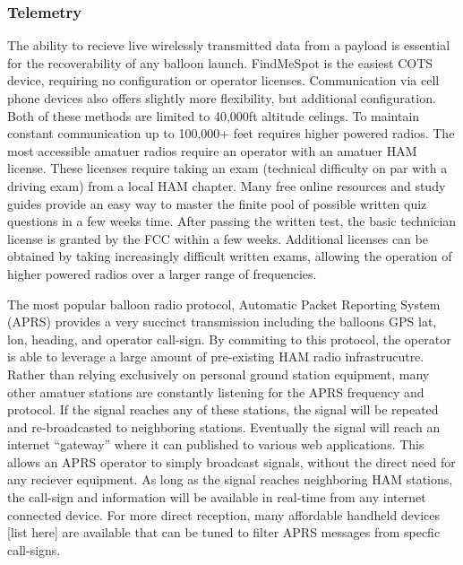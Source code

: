 \documentclass[heading.tex]{subfiles}
\begin{document}
\subsubsection{Telemetry}

The ability to recieve live wirelessly transmitted data from a payload is
essential for the recoverability of any balloon launch. FindMeSpot is the easiest
COTS device, requiring no configuration or operator licenses. Communication via
cell phone devices also offers slightly more flexibility, but additional configuration.
Both of these methods are limited to 40,000ft altitude celings. To maintain constant
communication up to 100,000+ feet requires higher powered radios. The most
accessible amatuer radios require an operator with an amatuer HAM license.
These licenses require taking an exam (technical difficulty on par with a
driving exam) from a local HAM chapter. Many free online resources and study
guides provide an easy way to master the finite pool of possible written quiz
questions in a few weeks time. After passing the written test, the basic
technician license is granted by the FCC within a few weeks. Additional licenses
can be obtained by taking increasingly difficult written exams, allowing the
operation of higher powered radios over a larger range of frequencies.

The most popular balloon radio protocol, Automatic Packet Reporting System (APRS)
provides a very succinct transmission including the balloons GPS lat, lon, heading,
and operator call-sign. By commiting to this protocol, the operator is able to
leverage a large amount of pre-existing HAM radio infrastrucutre. Rather than
relying exclusively on personal ground station equipment, many other amatuer
stations are constantly listening for the APRS frequency and protocol. If the
signal reaches any of these stations, the signal will be repeated and re-broadcasted
to neighboring stations. Eventually the signal will reach an internet ``gateway''
where it can published to various web applications. This allows an APRS operator
to simply broadcast signals, without the direct need for any reciever equipment.
As long as the signal reaches neighboring HAM stations, the call-sign and information
will be available in real-time from any internet connected device. For more direct
reception, many affordable handheld devices [list here] are available that can
be tuned to filter APRS messages from specfic call-signs.
\end{document}
